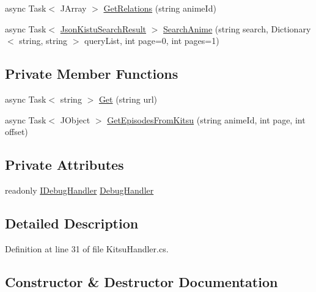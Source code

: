 \begin{DoxyCompactItemize}
\item 
async Task$<$ J\+Array $>$ \mbox{\hyperlink{class_little_weeb_library_1_1_handlers_1_1_kitsu_handler_ad1ba51037e72c80804018f4c1df37581}{Get\+Relations}} (string anime\+Id)
\item 
async Task$<$ \mbox{\hyperlink{class_little_weeb_library_1_1_models_1_1_json_kistu_search_result}{Json\+Kistu\+Search\+Result}} $>$ \mbox{\hyperlink{class_little_weeb_library_1_1_handlers_1_1_kitsu_handler_a92f121e8fec8cce5ffe0454d3a17c156}{Search\+Anime}} (string search, Dictionary$<$ string, string $>$ query\+List, int page=0, int pages=1)
\end{DoxyCompactItemize}
\subsection*{Private Member Functions}
\begin{DoxyCompactItemize}
\item 
async Task$<$ string $>$ \mbox{\hyperlink{class_little_weeb_library_1_1_handlers_1_1_kitsu_handler_a8b7c629a03096c3152252f6b5cf2937f}{Get}} (string url)
\item 
async Task$<$ J\+Object $>$ \mbox{\hyperlink{class_little_weeb_library_1_1_handlers_1_1_kitsu_handler_a27b4c1e9d11ba03420fbd13166e0f95b}{Get\+Episodes\+From\+Kitsu}} (string anime\+Id, int page, int offset)
\end{DoxyCompactItemize}
\subsection*{Private Attributes}
\begin{DoxyCompactItemize}
\item 
readonly \mbox{\hyperlink{interface_little_weeb_library_1_1_handlers_1_1_i_debug_handler}{I\+Debug\+Handler}} \mbox{\hyperlink{class_little_weeb_library_1_1_handlers_1_1_kitsu_handler_a6d3c55fa5eee15320845c2d902c96882}{Debug\+Handler}}
\end{DoxyCompactItemize}


\subsection{Detailed Description}


Definition at line 31 of file Kitsu\+Handler.\+cs.



\subsection{Constructor \& Destructor Documentation}
\mbox{\label{class_little_weeb_library_1_1_handlers_1_1_kitsu_handler_a92f980060f9277a512dfda67768a7428}} 
